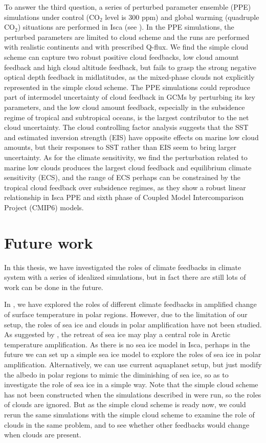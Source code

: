 To answer the third question, a series of perturbed parameter ensemble (PPE) simulations under control (CO$_2$ level is 300 ppm) and global warming (quadruple CO$_2$) situations are performed in Isca (see ). In the PPE simulations, the perturbed parameters are limited to cloud scheme and the runs are performed with realistic continents and with prescribed Q-flux. We find the simple cloud scheme can capture two robust positive cloud feedbacks, low cloud amount feedback and high cloud altitude feedback, but fails to grasp the strong negative optical depth feedback in midlatitudes, as the mixed-phase clouds not explicitly represented in the simple cloud scheme. The PPE simulations could reproduce part of intermodel uncertainty of cloud feedback in GCMs by perturbing its key parameters, and the low cloud amount feedback, especially in the subsidence regime of tropical and subtropical oceans, is the largest contributor to the net cloud uncertainty. The cloud controlling factor analysis suggests that the SST and estimated inversion strength (EIS) have opposite effects on marine low cloud amounts, but their responses to SST rather than EIS seem to bring larger uncertainty. As for the climate sensitivity, we find the perturbation related to marine low clouds produces the largest cloud feedback and equilibrium climate sensitivity (ECS), and the range of ECS perhaps can be constrained by the tropical cloud feedback over subsidence regimes, as they show a robust linear relationship in Isca PPE and sixth phase of Coupled Model Intercomparison Project (CMIP6) models.

\section{Future work}

In this thesis, we have investigated the 
roles of climate feedbacks in climate system with a series of idealized simulations, but in fact there are still lots of work can be done in the future.

In , we have explored the roles of different climate feedbacks in amplified change of surface temperature in polar regions. However, due to the limitation of our setup, the roles of sea ice and clouds in polar amplification have not been studied. As suggested by \cite{Screen2010}, the retreat of sea ice may play a central role in Arctic temperature amplification. As there is no sea ice model in Isca, perhaps in the future we can set up a simple sea ice model to explore the roles of sea ice in polar amplification. Alternatively, we can use current aquaplanet setup, but just modify the albedo in polar regions to mimic the diminishing of sea ice, so as to investigate the role of sea ice in a simple way. Note that the simple cloud scheme has not been constructed when the simulations described in  were run, so the roles of clouds are ignored. But as the simple cloud scheme is ready now, we could rerun the same simulations with the simple cloud scheme to examine the role of clouds in the same problem, and to see whether other feedbacks would change when clouds are present.


